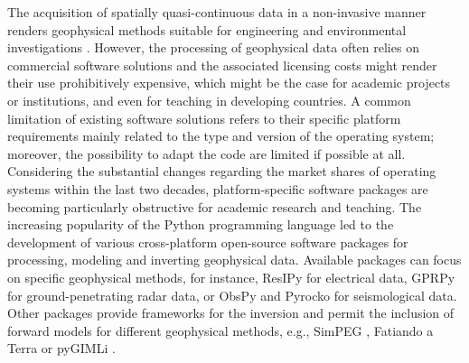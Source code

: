 \documentclass[a4paper,fleqn]{cas-sc}
\begin{document}
The acquisition of spatially quasi-continuous data in a non-invasive manner renders geophysical methods suitable for engineering and environmental investigations \citep[e.g.,][]{parsekian2015, nguyen2018, romero2019}.
However, the processing of geophysical data often relies on commercial software solutions and the associated licensing costs might render their use prohibitively expensive, which might be the case for academic projects or institutions, and even for teaching in developing countries.
A common limitation of existing software solutions refers to their specific platform requirements mainly related to the type and version of the operating system; moreover, the possibility to adapt the code are limited if possible at all. Considering the substantial changes regarding the market shares of operating systems within the last two decades, platform-specific software packages are becoming particularly obstructive for academic research and teaching.
The increasing popularity of the Python programming language led to the development of various cross-platform open-source software packages for processing, modeling and inverting geophysical data. Available packages can focus on specific geophysical methods, for instance, ResIPy \citep{blanchy2020} for electrical data, GPRPy \citep{plattner2020} for ground-penetrating radar data, or ObsPy \citep{beyreuther2010} and Pyrocko \citep{heimann2017} for seismological data. Other packages provide frameworks for the inversion and permit the inclusion of forward models for different geophysical methods, e.g., SimPEG \citep{cockett2015}, Fatiando a Terra \citep{uieda2013} or pyGIMLi \citep{ruecker2017}. 
\end{document}
